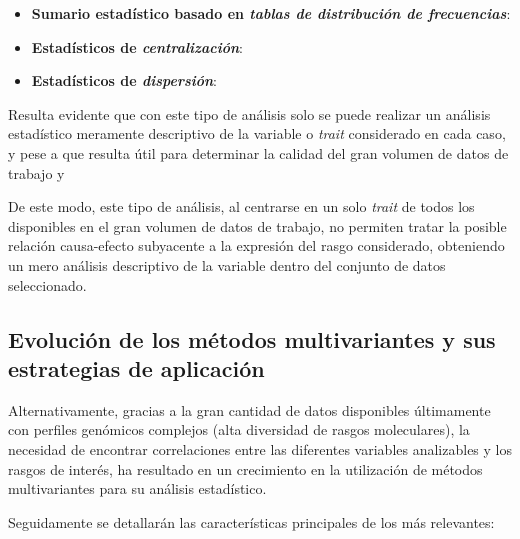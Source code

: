 \documentclass[IB,BIB]{TFUOC}%
\begin{document}
\footnotesize

\begin{itemize}
    \item \textbf{Sumario estadístico basado en  \textit{tablas de distribución de frecuencias}}:
    \item \textbf{Estadísticos de \textit{centralización}}:
    \item \textbf{Estadísticos de \textit{dispersión}}:
\end{itemize}

\normalsize

Resulta evidente que con este tipo de análisis solo se puede realizar un análisis estadístico meramente descriptivo de la variable o \textit{trait} considerado en cada caso, y pese a que resulta útil para determinar la calidad del gran volumen de datos de trabajo y 

De este modo, este tipo de análisis, al centrarse en un solo \textit{trait} de todos los disponibles en el gran volumen de datos de trabajo, no permiten tratar la posible relación causa-efecto subyacente a la expresión del rasgo considerado, obteniendo un mero análisis descriptivo de la variable dentro del conjunto de datos seleccionado.


\subsection{Evolución de los métodos multivariantes y sus estrategias de aplicación}
\label{sec:Evolución de los métodos multivariantes y sus estrategias de aplicación}

Alternativamente, gracias a la gran cantidad de datos disponibles últimamente con perfiles genómicos complejos (alta diversidad de rasgos moleculares), la necesidad de encontrar correlaciones entre las diferentes variables analizables y los rasgos de interés, ha resultado en un crecimiento en la utilización de métodos multivariantes para su análisis estadístico.

Seguidamente se detallarán las características principales de los más relevantes:
\end{document}
